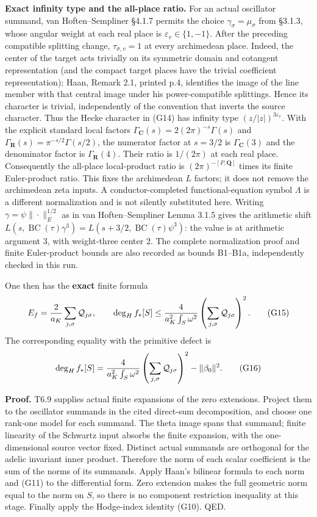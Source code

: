 \textbf{Exact infinity type and the all-place ratio.} For an actual oscillator summand, van Hoften--Sempliner §4.1.7 permits the choice \(\gamma_\sigma=\mu_\sigma\) from §3.1.3, whose angular weight at each real place is \(\varepsilon_v\in\{1,-1\}\). After the preceding compatible splitting change, \(\tau_{\sigma,v}=1\) at every archimedean place. Indeed, the center of the target acts trivially on its symmetric domain and cotangent representation (and the compact target places have the trivial coefficient representation); Haan, Remark 2.1, printed p.4, identifies the image of the line member with that central image under his power-compatible splittings. Hence its character is trivial, independently of the convention that inverts the source character. Thus the Hecke character in (G14) has infinity type \((z/|z|)^{3\varepsilon_v}\). With the explicit standard local factors \(\Gamma_{\mathbf C}(s)=2(2\pi)^{-s}\Gamma(s)\) and \(\Gamma_{\mathbf R}(s)=\pi^{-s/2}\Gamma(s/2)\), the numerator factor at \(s=3/2\) is \(\Gamma_{\mathbf C}(3)\) and the denominator factor is \(\Gamma_{\mathbf R}(4)\). Their ratio is \(1/(2\pi)\) at each real place. Consequently the all-place local-product ratio is \((2\pi)^{-[F:\mathbf Q]}\) times its finite Euler-product ratio. This fixes the archimedean \(L\) factors; it does not remove the archimedean zeta inputs. A conductor-completed functional-equation symbol \(\Lambda\) is a different normalization and is not silently substituted here. Writing \(\gamma=\psi\|\cdot\|_E^{1/2}\) as in van Hoften--Sempliner Lemma 3.1.5 gives the arithmetic shift \(L(s,\operatorname{BC}(\tau)\gamma^3)=L(s+3/2,\operatorname{BC}(\tau)\psi^3)\): the value is at arithmetic argument \(3\), with weight-three center \(2\). The complete normalization proof and finite Euler-product bounds are also recorded as bounds B1--B1a, independently checked in this run.

One then has the \textbf{exact} finite formula \[
E_f={2\over a_K}\sum_{j,\sigma}\mathcal Q_{j\sigma},
\qquad
\deg_H f_*[S]\le
{4\over a_K^2\int_S\omega^2}
\left(\sum_{j,\sigma}\mathcal Q_{j\sigma}\right)^2.
\tag{G15}
\] The corresponding equality with the primitive defect is \[
\deg_H f_*[S]=
{4\over a_K^2\int_S\omega^2}
\left(\sum_{j,\sigma}\mathcal Q_{j\sigma}\right)^2
-\|\beta_0\|^2.
\tag{G16}
\]

\textbf{Proof.} T6.9 supplies actual finite expansions of the zero extensions. Project them to the oscillator summands in the cited direct-sum decomposition, and choose one rank-one model for each summand. The theta image spans that summand; finite linearity of the Schwartz input absorbs the finite expansion, with the one-dimensional source vector fixed. Distinct actual summands are orthogonal for the adelic invariant inner product. Therefore the norm of each scalar coefficient is the sum of the norms of its summands. Apply Haan's bilinear formula to each norm and (G11) to the differential form. Zero extension makes the full geometric norm equal to the norm on \(S\), so there is no component restriction inequality at this stage. Finally apply the Hodge-index identity (G10). QED.

